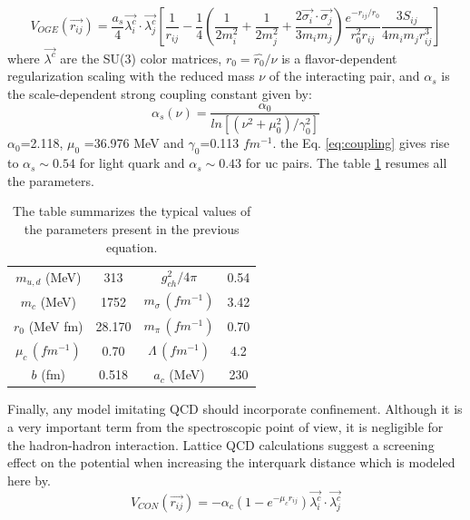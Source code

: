 \documentclass[12pt,a4paper]{book}
\begin{document}
	\begin{equation}
		V_{OGE}(\vec{r_{ij}}) = \frac{a_s}{4} \vec{\lambda_i^c} \cdot \vec{\lambda_j^c} \left[ \frac{1}{r_{ij}}- \frac{1}{4} \left(\frac{1}{2m_i^2} + \frac{1}{2m_j^2} + \frac{2 \vec{\sigma_i} \cdot \vec{\sigma_j}}{3 m_i m_j} \right) \frac{e^{-r_{ij}/r_0}}{r_0^2 r_{ij}} \frac{3 S_{ij}}{4m_i m_j r_{ij}^3} \right]
		\label{eq:one-gluon-exchange-potential}
	\end{equation}
	where $\vec{\lambda^c}$ are the SU(3) color matrices, $r_0= \hat{r_0}/\nu$ is a flavor-dependent regularization scaling	with the reduced mass $\nu$ of the interacting pair, and $\alpha_s$ is the scale-dependent strong coupling constant given by:
	\begin{equation}
		\alpha_s(\nu)= \frac{\alpha_0}{ln[(\nu^2+\mu_0^2)/\gamma_0^2]}
		\label{eq:coupling}
	\end{equation}
	$\alpha_0$=2.118, $\mu_0$ =36.976 MeV and $\gamma_0$=0.113 $fm^{-1}$. the Eq. \ref{eq:coupling} gives rise to $\alpha_s \sim 0.54$ for light quark and $\alpha_s \sim 0.43$ for uc pairs. The table \ref{tab:par-resume} resumes all the parameters.	
	\begin{table}[h]
		\centering
		\begin{tabular}{|c c | c c|}
			$m_{u,d}$ (MeV) & 313 & $g_{ch}^2 / 4\pi$ & 0.54 \\
			$m_{c}$ (MeV) & 1752 & $m_{\sigma} \, (fm^{-1})$ & 3.42 \\
			$\hat{r_0}$ (MeV fm) & 28.170 &  $m_{\pi} \, (fm^{-1})$ & 0.70 \\
			$\mu_c \, (fm^{-1})$ & 0.70 & $\Lambda \, (fm^{-1})$ & 4.2 \\
			$b$ (fm) & 0.518 & $a_c$ (MeV) & 230 \\
		\end{tabular}
		\caption{The table summarizes the typical values of the parameters present in the previous equation.}
		\label{tab:par-resume}
	\end{table}
	
	Finally, any model imitating QCD should incorporate confinement. Although it is a very important term from the spectroscopic point of view, it is negligible for the hadron-hadron interaction. Lattice QCD calculations suggest a screening effect on the potential when increasing the interquark distance which is modeled here by.
	\begin{equation}
		V_{CON}(\vec{r_{ij}})= -\alpha_c (1-e^{-\mu_c r_{ij}}) \vec{\lambda_i^c} \cdot \vec{\lambda_j^c}
		\label{eq:confinement}
	\end{equation}
	
\end{document}
